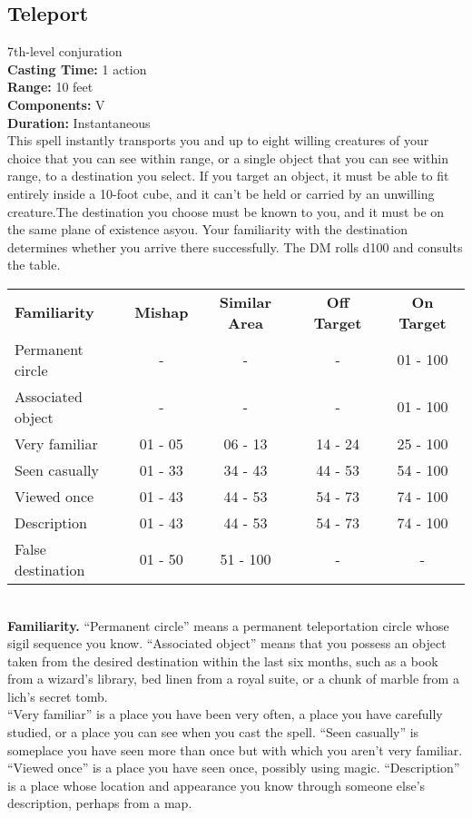 \documentclass[11pt, A4paper, english]{article}
\begin{document}
		\subsection{Teleport}
7th-level conjuration \\
\textbf{Casting Time:} 1 action \\
\textbf{Range:} 10 feet \\
\textbf{Components:} V \\
\textbf{Duration:} Instantaneous \\
This spell instantly transports you and up to eight willing creatures of your choice that you can see within range, or a single object that you can see within range, to a destination you select. If you target an object, it must be able to fit entirely inside a  10-foot cube, and it can’t be held or carried by an unwilling creature.The destination you choose must be known to you, and it must be on the same plane of existence asyou. Your familiarity with the destination determines whether you arrive there successfully. The DM rolls d100 and consults the table. \\
			\begin{tabular}{lcccc}
\textbf{Familiarity} & \textbf{Mishap} & \textbf{Similar Area} & \textbf{Off Target} & \textbf{On Target} \\
Permanent circle & - & - & - & 01 - 100 \\
Associated object & - & - & - & 01 - 100 \\
Very familiar & 01 - 05 & 06 - 13 & 14 - 24 & 25 - 100 \\
Seen casually & 01 - 33 & 34 - 43 & 44 - 53 & 54 - 100 \\
Viewed once & 01 - 43 & 44 - 53 & 54 - 73 & 74 - 100 \\
Description & 01 - 43 & 44 - 53 & 54 - 73 & 74 - 100 \\
False destination & 01 - 50 & 51 - 100 & - & -
			\end{tabular} \\
\textbf{Familiarity.} “Permanent circle” means a permanent teleportation circle whose sigil sequence you know. “Associated object” means that you possess an object taken from the desired destination within the last six months, such as a book from a wizard’s library, bed linen from a royal suite, or a chunk of marble from a lich’s secret tomb. \\
“Very familiar” is a place you have been very often, a place you have carefully studied, or a place you can see when you cast the spell. “Seen casually” is someplace you have seen more than once but with which you aren’t very familiar. “Viewed once” is a place you have seen once, possibly using magic. “Description” is a place whose location and appearance you know through someone else’s description, perhaps from a map. \\
\end{document}
